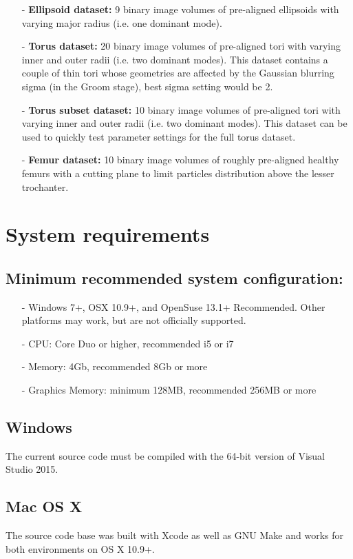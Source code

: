\documentclass[letterpaper,12pt]{article}   %
\begin{document}
\begin{itemize}
	\item [-] \textbf{Ellipsoid dataset:} 9 binary image volumes of pre-aligned ellipsoids with varying major radius (i.e. one dominant mode).
		\item [-] \textbf{Torus dataset:} 20 binary image volumes of pre-aligned tori with varying inner and outer radii (i.e. two dominant modes). This dataset contains a couple of thin tori whose geometries are affected by the Gaussian blurring sigma (in the Groom stage), best sigma setting would be 2.
		\item [-] \textbf{Torus subset dataset:} 10 binary image volumes of pre-aligned tori with varying inner and outer radii (i.e. two dominant modes). This dataset can be used to quickly test parameter settings for the full torus dataset.
		\item [-] \textbf{Femur dataset:} 10 binary image volumes of roughly pre-aligned healthy femurs with a cutting plane to limit particles distribution above the lesser trochanter.
\end{itemize} 


\section{System requirements}

\subsection{Minimum recommended system configuration:}
\begin{itemize}
	\item[-] Windows 7+, OSX 10.9+, and OpenSuse 13.1+ Recommended. Other platforms may work, but are not officially supported.
		\item[-] CPU: Core Duo or higher, recommended i5 or i7
	\item[-] 	Memory: 4Gb, recommended 8Gb or more
	\item[-] 	Graphics Memory: minimum 128MB, recommended 256MB or more
\end{itemize}

\subsection{Windows}
The current source code must be compiled with the 64-bit version of Visual Studio 2015.

\subsection{Mac OS X}
The source code base was built with Xcode as well as GNU Make and works for both environments on OS X 10.9+.
\end{document}
